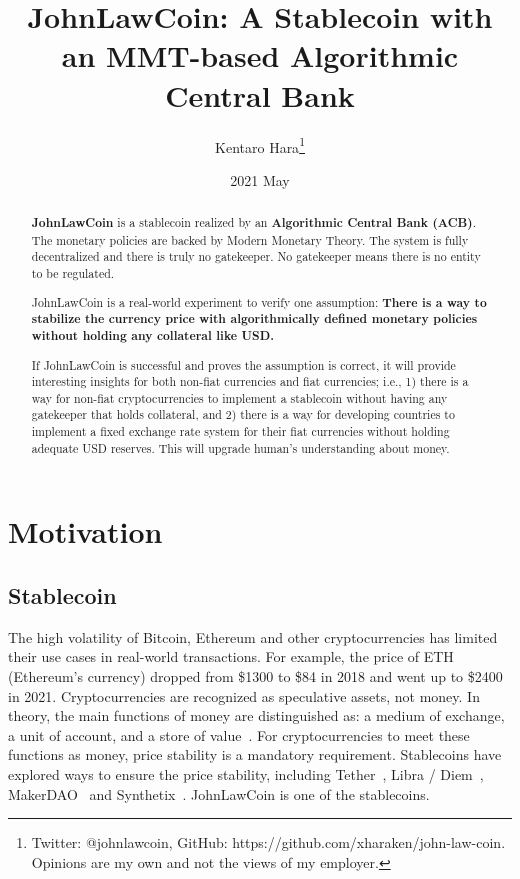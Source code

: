 \documentclass[dvipdfmx,a4paper]{article}
\title{\textbf{JohnLawCoin: A Stablecoin with\\ an MMT-based Algorithmic Central Bank}}
\author{Kentaro Hara\footnote{Twitter: @johnlawcoin, GitHub: https://github.com/xharaken/john-law-coin. Opinions are my own and not the views of my employer.}}
\date{2021 May}
\begin{document}
\maketitle

\begin{abstract}

\textbf{JohnLawCoin} is a stablecoin realized by an \textbf{Algorithmic Central Bank (ACB)}. The monetary policies are backed by Modern Monetary Theory. The system is fully decentralized and there is truly no gatekeeper. No gatekeeper means there is no entity to be regulated.

JohnLawCoin is a real-world experiment to verify one assumption: \textbf{There is a way to stabilize the currency price with algorithmically defined monetary policies without holding any collateral like USD.}

If JohnLawCoin is successful and proves the assumption is correct, it will provide interesting insights for both non-fiat currencies and fiat currencies; i.e., 1) there is a way for non-fiat cryptocurrencies to implement a stablecoin without having any gatekeeper that holds collateral, and 2) there is a way for developing countries to implement a fixed exchange rate system for their fiat currencies without holding adequate USD reserves. This will upgrade human's understanding about money.

\end{abstract}

\section{Motivation}

\subsection{Stablecoin}

The high volatility of Bitcoin, Ethereum and other cryptocurrencies has limited their use cases in real-world transactions. For example, the price of ETH (Ethereum's currency) dropped from \$1300 to \$84 in 2018 and went up to \$2400 in 2021. Cryptocurrencies are recognized as speculative assets, not money. In theory, the main functions of money are distinguished as: a medium of exchange, a unit of account, and a store of value~\cite{davies2010history,ferguson2008ascent}. For cryptocurrencies to meet these functions as money, price stability is a mandatory requirement. Stablecoins have explored ways to ensure the price stability, including Tether~\cite{tether}, Libra / Diem~\cite{libra}, MakerDAO~\cite{makerdao} and Synthetix~\cite{synthetix}. JohnLawCoin is one of the stablecoins.
\end{document}
